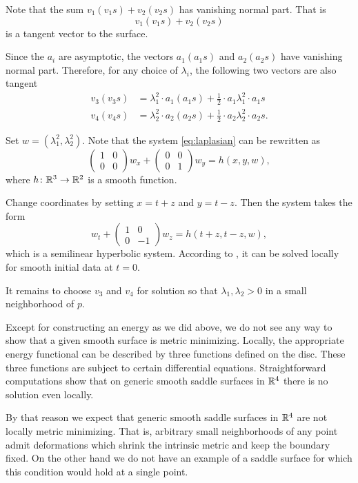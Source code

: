 \documentclass{article}
\begin{document}
Note that the sum $v_1(v_1s)+v_2(v_2s)$ has vanishing normal part.
That is \[v_1(v_1s)+v_2(v_2s)\] is a tangent vector to the surface.

Since the $a_i$ are asymptotic,
the vectors $a_1(a_1s)$ and $a_2(a_2s)$ have vanishing normal part.
Therefore, for any choice of $\lambda_i$,
the following two vectors are also tangent
\begin{align*}
v_3(v_3s)&=\lambda_1^2\cdot a_1(a_1s)+\tfrac12\cdot a_1\lambda_1^2\cdot a_1s
\\
v_4(v_4s)&=\lambda_2^2\cdot a_2(a_2s)+\tfrac12\cdot a_2\lambda_2^2\cdot a_2s.
\end{align*}

Set $w=(\lambda_1^2,\lambda_2^2)$.
Note that the system \ref{eq:laplasian} can be rewritten as 
\[\left(\begin{smallmatrix}
   1&0\\0&0
  \end{smallmatrix}\right)
w_x
+
\left(\begin{smallmatrix}
   0&0\\0&1
  \end{smallmatrix}\right)
w_y=h(x,y,w),\]
where $h\colon\mathbb{R}^3\to\mathbb{R}^2$ is a smooth function.

Change coordinates by setting $x=t+z$ and $y=t-z$.
Then the system takes the form 
\[w_t+\left(\begin{smallmatrix}
   1&0\\0&-1
  \end{smallmatrix}\right)
w_z=h(t+z,t-z,w),\]
which is a semilinear hyperbolic system.
According to \cite[Theorem 3.6]{bressan}, it can be solved locally for smooth initial data at $t=0$.

It remains to choose $v_3$ and $v_4$ for solution so that $\lambda_1, \lambda_2>0$ in a small neighborhood of $p$.
\qeds

Except for constructing an energy as we did above,
we do not see any way to show that a given smooth surface is metric minimizing.
Locally, the appropriate energy functional can be described by three functions defined on the disc.
These three functions are subject to certain differential equations.
Straightforward computations show that on generic smooth saddle surfaces in $\mathbb{R}^4$ 
there is no solution even locally.

By that reason we expect that generic smooth saddle surfaces in $\mathbb{R}^4$ are not locally metric minimizing. 
That is, arbitrary small neighborhoods of any point admit deformations which shrink 
the intrinsic metric and keep the boundary fixed.
On the other hand we do not have an example of a saddle surface for which this condition would hold at a single point.
\end{document}

